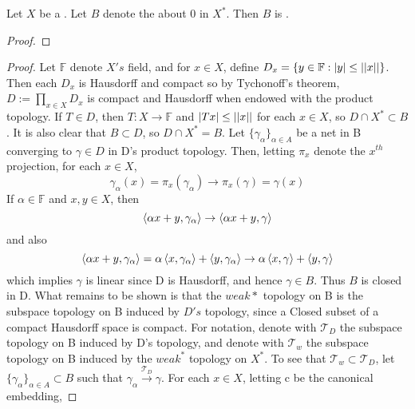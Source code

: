 \begin{thm}
    \label{thm:banachalaoglu}
    \rm
    Let $X$ be a \NormedSpace.
    Let $B$ denote the \ClosedUnitBall about $0$ in $X^*$. 
    Then $B$ is \weakstar \SetCompact.
    \begin{proof}
    \end{proof}


    \begin{proof}
        Let $\mathbb{F}$ denote $X's$ field, and for $x \in X$, define $D_x=\{y \in \mathbb{F}: \left| y \right| \leq \left|\left| x \right|\right|\}$. 
        Then each $D_x$ is Hausdorff and compact so by Tychonoff's theorem, $D:=\prod_{x \in X} D_x$ is compact and Hausdorff when endowed with the product topology. 
        If $T \in D$, then $T:X \to \mathbb{F}$ and $\left| Tx \right| \leq \left|\left| x \right|\right|$ for each $x \in X$, so $D \cap X^* \subset B$. 
        It is also clear that $B \subset D$, so $D \cap X^* = B$. 
        Let $\{\gamma_\alpha\}_{\alpha \in A}$ be a net in B converging to $\gamma \in D$ in D's product topology. 
        Then, letting $\pi_x$ denote the $x^{th}$ projection, for each $x \in X$, 
        \begin{equation}
            \gamma_{\alpha}(x) = \pi_x(\gamma_\alpha) \to \pi_x(\gamma) = \gamma(x)
        \end{equation}
        If $\alpha \in \mathbb{F}$ and $x,y \in X$, then 
        \begin{equation}
            \left\langle \alpha x+y, \gamma_\alpha \right\rangle \to \left\langle  \alpha x+y, \gamma \right\rangle
        \end{equation}
        and also
        \begin{equation}
            \left\langle \alpha x+y,\gamma_\alpha \right\rangle = \alpha \left\langle x,\gamma_\alpha \right\rangle+ \left\langle y,\gamma_\alpha \right\rangle \to \alpha \left\langle x,\gamma \right\rangle+\left\langle y,\gamma \right\rangle
        \end{equation}
        which implies $\gamma$ is linear since D is Hausdorff, and hence $\gamma \in B$. 
        Thus $B$ is closed in D. What remains to be shown is that the $weak*$ topology on B is the subspace topology on B induced by $D's$ topology, since a Closed subset of a compact Hausdorff space is compact. 
        For notation, denote with $\mathcal{T}_D$ the subspace topology on B induced by D's topology, and denote with $\mathcal{T}_w$ the subspace topology on B induced by the  $weak^*$ topology on $X^*$. 
        To see that $\mathcal{T}_w \subset \mathcal{T}_D$, let $\{\gamma_\alpha\}_{\alpha \in A} \subset B$ such that $\gamma_\alpha \overset{\mathcal{T}_D}{\to} \gamma$. For each $x \in X$, letting c be the canonical embedding, 

\end{proof}
\end{thm}
